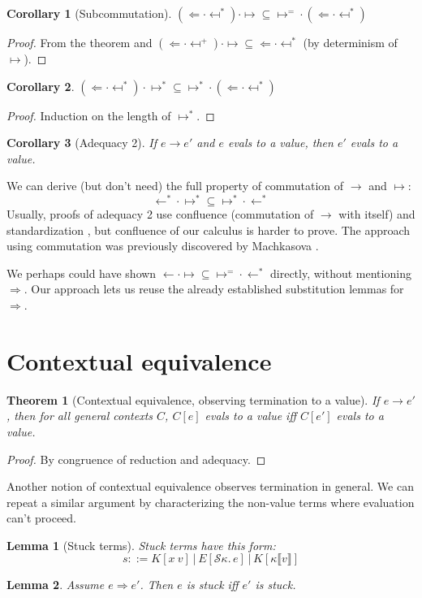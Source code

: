 \documentclass[a4paper, 11pt,titlepage, openright, twoside]{report}
\newcommand{\Int}{\Rightarrow}
\newcommand{\Tni}{\Leftarrow}
\renewcommand{\S}{\mathcal{S}}
\newcommand{\+}{\enspace}
\newtheorem{corollary}{Corollary}
\newtheorem{lemma}{Lemma}
\newtheorem{theorem}{Theorem}
\begin{document}
\begin{corollary}[Subcommutation]
	${(\Tni · \mapsfrom^*) · ↦} ⊆ {↦^= \mathbin{·} ({{\Tni} · \mapsfrom^*})}$
\end{corollary}
\begin{proof}
	From the theorem %
	and
	${(\Tni · \mapsfrom^+) · ↦} ⊆ {{{\Tni} · \mapsfrom^*}}$ (by determinism of $↦$).
\end{proof}
\begin{corollary}
	${(\Tni · \mapsfrom^*) · ↦^*} ⊆ {↦^* \mathbin{·} ({{\Tni} · \mapsfrom^*})}$
\end{corollary}
\begin{proof}
	Induction on the length of $↦^*$.
\end{proof}
\begin{corollary}[Adequacy 2]
	If $e → e'$ and $e$ evals to a value, then $e'$ evals to a value.
\end{corollary}

We can derive (but don't need) the full property of commutation of $→$ and $↦$:
$${←^* · ↦^*} ⊆ {↦^* · ←^*}$$
Usually, proofs of adequacy 2 use confluence (commutation of $→$ with itself) and standardization \cite{Plotkin75, crary2009},
but confluence of our calculus is harder to prove.
The approach using commutation was previously discovered by Machkasova \cite{machka}.

We perhaps could have shown ${← · ↦} ⊆ {↦^= · ←^*}$ directly, without mentioning $\Int$.
Our approach lets us reuse the already established substitution lemmas for $\Int$.

\section{Contextual equivalence}

\begin{theorem}[Contextual equivalence, observing termination to a value]
	\label{ctxeqv1}
	If $e → e'$, then for all general contexts $C$, $C[e]$ evals to a value iff $C[e']$ evals to a value.%
\end{theorem}
\begin{proof}
	By congruence of reduction and adequacy.
\end{proof}

Another notion of contextual equivalence observes termination in general.
We can repeat a similar argument by characterizing the non-value terms
where evaluation can't proceed.

\begin{lemma}[Stuck terms]
	Stuck terms have this form:
	$$s ::= K[x\:v] │ E[\S κ.\,e] │ K[κ⟦v⟧]$$
\end{lemma}
\begin{lemma} Assume $e \Int e'$. Then $e$ is stuck iff $e'$ is stuck.
\end{lemma}
\end{document}
